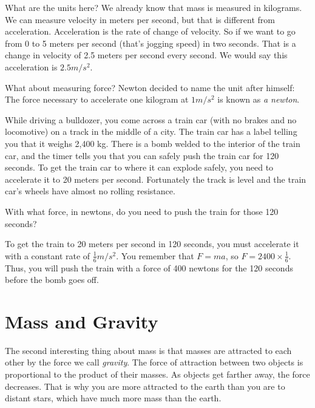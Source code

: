 What are the units here? We already know that mass is measured in
kilograms. We can measure velocity in meters per second, but that is
different from acceleration. Acceleration is the rate of change of
velocity. So if we want to go from 0 to 5 meters per second (that's
jogging speed) in two seconds. That is a change in velocity of 2.5
meters per second every second. We would say this acceleration is $2.5
m/s^2$.

What about measuring force? Newton decided to name the unit after
himself: The force necessary to accelerate one kilogram at $1 m/s^2$
is known as \textit{a newton}.

\begin{Exercise}[title={Acceleration}, label=acceleration_train]
  
While driving a bulldozer, you come across a train car (with no brakes
and no locomotive) on a track in the middle of a city. The train car
has a label telling you that it weighs 2,400 kg. There is a bomb
welded to the interior of the train car, and the timer tells you that
you can safely push the train car for 120 seconds. To get the train
car to where it can explode safely, you need to accelerate it to 20 meters per
second. Fortunately the track is level and the train car's wheels have
almost no rolling resistance.

With what force, in newtons, do you need to push the train for those 120 seconds?

\end{Exercise}
\begin{Answer}[ref=acceleration_train]
To get the train to 20 meters per second in 120 seconds, you must
accelerate it with a constant rate of $\frac{1}{6} m/s^2$. You
remember that $F = m a$, so $F = 2400 \times \frac{1}{6}$. Thus, you
will push the train with a force of 400 newtons for the 120 seconds
before the bomb goes off.
\end{Answer}

\section{Mass and Gravity}

The second interesting thing about mass is that masses are
attracted to each other by the force we call \textit{gravity}. The
force of attraction between two objects is proportional to the product
of their masses. As objects get farther away, the force decreases.
That is why you are more attracted to the earth than you are to
distant stars, which have much more mass than the earth.

